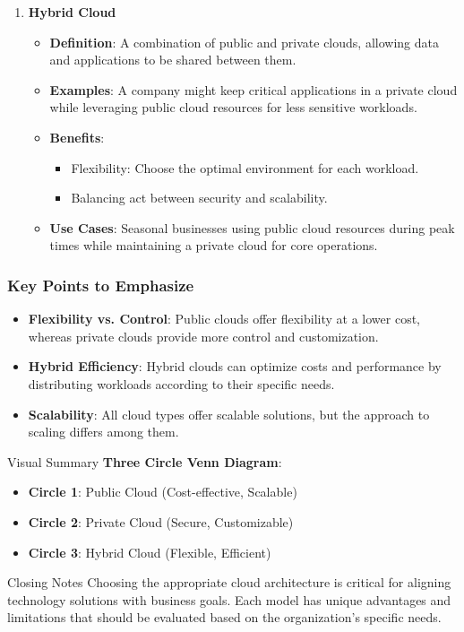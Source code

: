 \documentclass[aspectratio=169]{beamer}
\begin{document}
\begin{frame}[fragile]
\begin{enumerate}
    \item \textbf{Hybrid Cloud}
      \begin{itemize}
        \item \textbf{Definition}: A combination of public and private clouds, allowing data and applications to be shared between them.
        \item \textbf{Examples}: A company might keep critical applications in a private cloud while leveraging public cloud resources for less sensitive workloads.
        \item \textbf{Benefits}:
          \begin{itemize}
            \item Flexibility: Choose the optimal environment for each workload.
            \item Balancing act between security and scalability.
          \end{itemize}
        \item \textbf{Use Cases}: Seasonal businesses using public cloud resources during peak times while maintaining a private cloud for core operations.
      \end{itemize}
  \end{enumerate}
\end{frame}

\begin{frame}[fragile]
  \frametitle{Key Points to Emphasize}
  
  \begin{itemize}
    \item \textbf{Flexibility vs. Control}: Public clouds offer flexibility at a lower cost, whereas private clouds provide more control and customization.
    \item \textbf{Hybrid Efficiency}: Hybrid clouds can optimize costs and performance by distributing workloads according to their specific needs.
    \item \textbf{Scalability}: All cloud types offer scalable solutions, but the approach to scaling differs among them.
  \end{itemize}

  \begin{block}{Visual Summary}
    \textbf{Three Circle Venn Diagram}:
    \begin{itemize}
      \item \textbf{Circle 1}: Public Cloud (Cost-effective, Scalable)
      \item \textbf{Circle 2}: Private Cloud (Secure, Customizable)
      \item \textbf{Circle 3}: Hybrid Cloud (Flexible, Efficient)
    \end{itemize}
  \end{block}
  
  \begin{block}{Closing Notes}
    Choosing the appropriate cloud architecture is critical for aligning technology solutions with business goals. Each model has unique advantages and limitations that should be evaluated based on the organization's specific needs.
  \end{block}
\end{frame}
\end{document}
